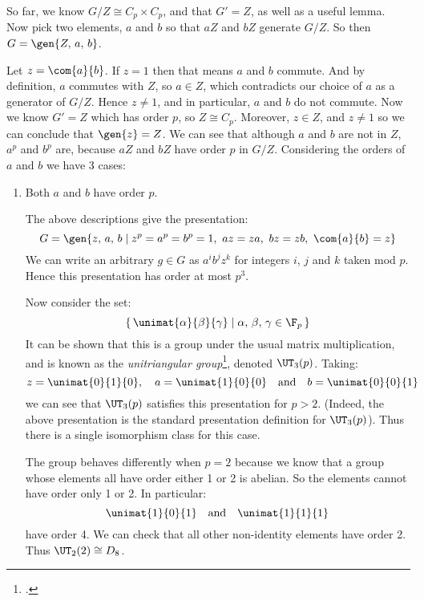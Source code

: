 So far, we know \(G/Z \cong C_p \times C_p\), and that \(G' = Z\), as well as a useful lemma.
Now pick two elements, \(a\) and \(b\) so that \(aZ\) and \(bZ\) generate \(G/Z\).
So then \(G = \gen{Z,\,a,\,b}\).

Let \(z = \com{a}{b}\).
If \(z = 1\) then that means \(a\) and \(b\) commute.
And by definition, \(a\) commutes with \(Z\), so \(a \in Z\), which contradicts our choice of \(a\) as a generator of
\(G/Z\).
Hence \(z \neq 1\), and in particular, \(a\) and \(b\) do not commute.
Now we know \(G' = Z\) which has order \(p\), so \(Z \cong C_p\).
Moreover, \(z \in Z\), and \(z \neq 1\) so we can conclude that \(\gen{z} = Z\).
We can see that although \(a\) and \(b\) are not in \(Z\), \(a^p\) and \(b^p\) are, because \(aZ\) and \(bZ\) have order
\(p\) in \(G/Z\).
Considering the orders of \(a\) and \(b\) we have 3 cases:

\begin{enumerate}
    \item Both \(a\) and \(b\) have order \(p\).

        The above descriptions give the presentation:
        \[G = \gen{z,\,a,\,b \mid z^p = a^p = b^p = 1,\ az = za,\ bz = zb,\ \com{a}{b} = z}\]
        We can write an arbitrary \(g \in G\) as \(a^i b^j z^k\) for integers \(i\), \(j\) and \(k\) taken mod \(p\).
        Hence this presentation has order at most \(p^3\).

        Now consider the set:
        \[\left\{\,\unimat{\alpha}{\beta}{\gamma} \mid \alpha,\,\beta,\,\gamma \in \F_p\,\right\}\]
        It can be shown that this is a group under the usual matrix multiplication, and is known as the
        \emph{unitriangular group}\footcite{unitriangular}, denoted \(\UT_3(p)\).
        Taking:
        \[z = \unimat{0}{1}{0}, \quad a = \unimat{1}{0}{0} \quad \text{and} \quad b = \unimat{0}{0}{1}\]
        we can see that \(\UT_3(p)\) satisfies this presentation for \(p > 2\).
        (Indeed, the above presentation is the standard presentation definition for \(\UT_3(p)\)).
        Thus there is a single isomorphism class for this case.

        The group behaves differently when \(p = 2\) because we know that a group whose elements all have order either 1
        or 2 is abelian.
        So the elements cannot have order only 1 or 2.
        In particular:
        \[\unimat{1}{0}{1} \quad \text{and} \quad \unimat{1}{1}{1}\]
        have order 4.
        We can check that all other non-identity elements have order 2.
        Thus \(\UT_2(2) \cong D_8\).
\end{enumerate}

